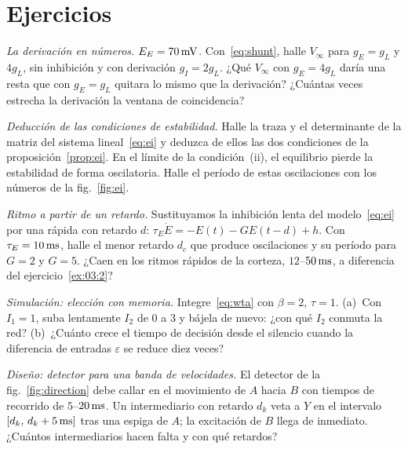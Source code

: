 \section{Ejercicios}

\begin{exercise}[\lvlA]
\label{ex:03:1}
\emph{La derivación en números.} $E_E=70\,\text{mV}$. Con~\eqref{eq:shunt}, halle $V_\infty$ para $g_E=g_L$ y $4g_L$, sin inhibición y con derivación $g_I=2g_L$. ¿Qué $V_\infty$ con $g_E=4g_L$ daría una resta que con $g_E=g_L$ quitara lo mismo que la derivación? ¿Cuántas veces estrecha la derivación la ventana de coincidencia?
\end{exercise}

\begin{exercise}[\lvlB]
\label{ex:03:2}
\emph{Deducción de las condiciones de estabilidad.} Halle la traza y el determinante de la matriz del sistema lineal~\eqref{eq:ei} y deduzca de ellos las dos condiciones de la proposición~\ref{prop:ei}. En el límite de la condición~(ii), el equilibrio pierde la estabilidad de forma oscilatoria. Halle el período de estas oscilaciones con los números de la fig.~\ref{fig:ei}.
\end{exercise}

\begin{exercise}[\lvlB]
\label{ex:03:3}
\emph{Ritmo a partir de un retardo.} Sustituyamos la inhibición lenta del modelo~\eqref{eq:ei} por una rápida con retardo $d$: $\tau_E\dot E=-E(t)-GE(t-d)+h$. Con $\tau_E=10\,\text{ms}$, halle el menor retardo $d_c$ que produce oscilaciones y su período para $G=2$ y $G=5$. ¿Caen en los ritmos rápidos de la corteza, $12$--$50\,\text{ms}$, a diferencia del ejercicio~\ref{ex:03:2}?
\end{exercise}

\begin{exercise}[\lvlB]
\label{ex:03:4}
\emph{Simulación: elección con memoria.} Integre~\eqref{eq:wta} con $\beta=2$, $\tau=1$. (a)~Con $I_1=1$, suba lentamente $I_2$ de $0$ a $3$ y bájela de nuevo: ¿con qué $I_2$ conmuta la red? (b)~¿Cuánto crece el tiempo de decisión desde el silencio cuando la diferencia de entradas $\varepsilon$ se reduce diez veces?
\end{exercise}

\begin{exercise}[\lvlB]
\label{ex:03:5}
\emph{Diseño: detector para una banda de velocidades.} El detector de la fig.~\ref{fig:direction} debe callar en el movimiento de $A$ hacia $B$ con tiempos de recorrido de $5$--$20\,\text{ms}$. Un intermediario  con retardo $d_k$ veta a $Y$ en el intervalo $[d_k,\,d_k+5\,\text{ms}]$ tras una espiga de $A$; la excitación de $B$ llega de inmediato. ¿Cuántos intermediarios hacen falta y con qué retardos?
\end{exercise}

